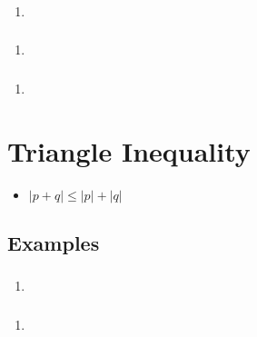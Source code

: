 \documentclass{report}
\newcommand{\abs}[1]{\mathopen|#1\mathclose|}
\begin{document}
                \subsubsection{}
                    \begin{enumerate}
                        \item 
                    \end{enumerate}
                \subsubsection{}
                    \begin{enumerate}
                        \item 
                    \end{enumerate}
                \subsubsection{}
                    \begin{enumerate}
                        \item 
                    \end{enumerate}
        \section{Triangle Inequality}
            \begin{itemize}
                \item $\abs{p+q}\leq\abs{p}+\abs{q}$
            \end{itemize}
            \subsection{Examples}
                \subsubsection{}
                    \begin{enumerate}
                        \item 
                    \end{enumerate}
                \subsubsection{}
                    \begin{enumerate}
                        \item 
                    \end{enumerate}
\end{document}

